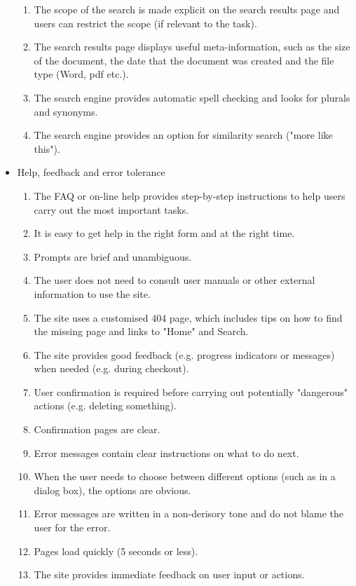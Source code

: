 \begin{itemize}
\begin{enumerate}
        \item The scope of the search is made explicit on the search results page and users can restrict the scope (if relevant to the task).
        \item The search results page displays useful meta-information, such as the size of the document, the date that the document was created and the file type (Word, pdf etc.).
        \item The search engine provides automatic spell checking and looks for plurals and synonyms.
        \item The search engine provides an option for similarity search ("more like this").        
      \end{enumerate}
  \item Help, feedback and error tolerance
      \begin{enumerate}
        \item The FAQ or on-line help provides step-by-step instructions to help users carry out the most important tasks.
        \item It is easy to get help in the right form and at the right time.
        \item Prompts are brief and unambiguous.
        \item The user does not need to consult user manuals or other external information to use the site.
        \item The site uses a customised 404 page, which includes tips on how to find the missing page and links to "Home" and Search.
        \item The site provides good feedback (e.g. progress indicators or messages) when needed (e.g. during checkout).
        \item User confirmation is required before carrying out potentially "dangerous" actions (e.g. deleting something).
        \item Confirmation pages are clear.
        \item Error messages contain clear instructions on what to do next.
        \item When the user needs to choose between different options (such as in a dialog box), the options are obvious.
        \item Error messages are written in a non-derisory tone and do not blame the user for the error.
        \item Pages load quickly (5 seconds or less).
        \item The site provides immediate feedback on user input or actions.

\end{enumerate}
\end{itemize}
